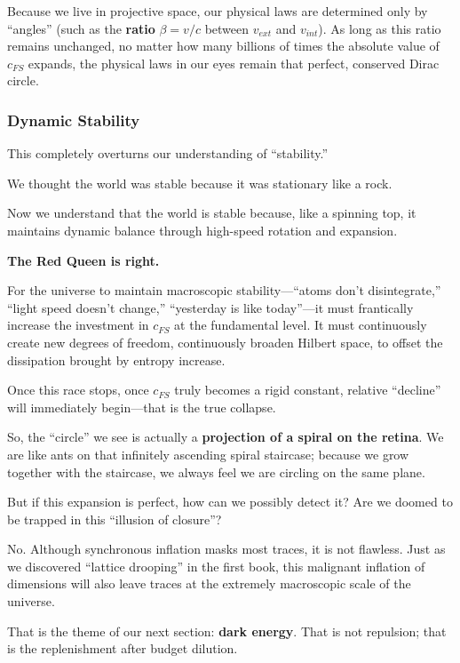 Because we live in projective space, our physical laws are determined only by ``angles'' (such as the \textbf{ratio} $\beta = v/c$ between $v_{ext}$ and $v_{int}$). As long as this ratio remains unchanged, no matter how many billions of times the absolute value of $c_{FS}$ expands, the physical laws in our eyes remain that perfect, conserved Dirac circle.

\subsubsection{Dynamic Stability}

This completely overturns our understanding of ``stability.''

We thought the world was stable because it was stationary like a rock.

Now we understand that the world is stable because, like a spinning top, it maintains dynamic balance through high-speed rotation and expansion.

\textbf{The Red Queen is right.}

For the universe to maintain macroscopic stability---``atoms don't disintegrate,'' ``light speed doesn't change,'' ``yesterday is like today''---it must frantically increase the investment in $c_{FS}$ at the fundamental level. It must continuously create new degrees of freedom, continuously broaden Hilbert space, to offset the dissipation brought by entropy increase.

Once this race stops, once $c_{FS}$ truly becomes a rigid constant, relative ``decline'' will immediately begin---that is the true collapse.

So, the ``circle'' we see is actually a \textbf{projection of a spiral on the retina}. We are like ants on that infinitely ascending spiral staircase; because we grow together with the staircase, we always feel we are circling on the same plane.

But if this expansion is perfect, how can we possibly detect it? Are we doomed to be trapped in this ``illusion of closure''?

No. Although synchronous inflation masks most traces, it is not flawless. Just as we discovered ``lattice drooping'' in the first book, this malignant inflation of dimensions will also leave traces at the extremely macroscopic scale of the universe.

That is the theme of our next section: \textbf{dark energy}. That is not repulsion; that is the replenishment after budget dilution.


